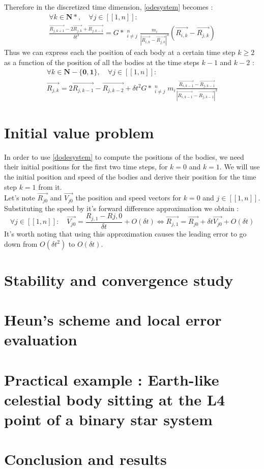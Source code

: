 \documentclass[a4paper,11pt]{article}
\begin{document}
Therefore in the discretized time dimension, \eqref{odesystem} becomes :
\begin{multline}
  \forall k \in \mathbf{N*},\quad \forall j \in [[1, n]]:\\
  \frac{\vec{R_{j,k+1}} - 2 \vec{R_{j,k}} + \vec{R_{j,k-1}}}{\delta t^2} = 
  G*\mathop{\sum_{i=1}}_{i \ne j}^n \frac{m_i}{|{\vec{R_{i,k}} - \vec{R_{j,k}}}|^3}
  (\vec{R_{i,k}} - \vec{R_{j,k}})
\end{multline}
Thus we can express each the position of each body at a certain time step $k \ge 2$
as a function of the position of all the bodies at the time steps $k - 1$ and $k - 2$ :
\begin{multline}
  \forall k \in \mathbf{N-\{0,1\}},\quad \forall j \in [[1, n]]:\\
  \vec{R_{j,k}} = 2 \vec{R_{j,k-1}} - \vec{R_{j,k-2}} +
  \delta t^2 G* \mathop{\sum_{i=1}}_{i \ne j}^n m_i
  \frac{\vec{R_{i,k-1}} - \vec{R_{j,k-1}}}{|{\vec{R_{i,k-1}} - \vec{R_{j,k-1}}}|^3}
  \label{dodesystem}
\end{multline}
\section{Initial value problem}
In order to use \eqref{dodesystem} to compute the positions of the bodies, we need their
initial positions for the first two time steps, for $k = 0$ and $k = 1$.
We will use the initial position and speed of the bodies and derive their position
for the time step $k = 1$ from it.\\
Let's note $\vec{R_{j0}}$ and $\vec{V_{j0}}$ the
position and speed vectors for $k=0$ and \linebreak[4] $j \in [[1, n]]$.
Substituting the speed by it's forward difference approximation we obtain :
\begin{equation}
  \forall j \in [[1, n]]: \quad
  \vec{V_{j0}} = \frac{R_{j,1} - R{j, 0}}{\delta t} + O(\delta t)
  \Leftrightarrow
  \vec{R_{j,1}} = \vec{R_{j0}} + \delta t \vec{V_{j0}} + O(\delta t)
\end{equation}
It's worth noting that using this approximation causes the leading error to go
down from $O(\delta t^2)$ to $O(\delta t)$.
\section{Stability and convergence study}
\section{Heun's scheme and local error evaluation}
\section{Practical example : Earth-like celestial body sitting at the L4 point of
a binary star system}
\section{Conclusion and results}
\end{document}
